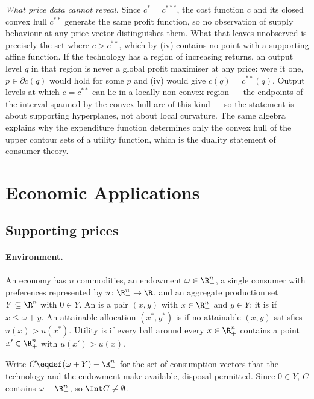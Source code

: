 \emph{What price data cannot reveal.} Since $c^{\ast}=c^{\ast\ast\ast}$, the
cost function $c$ and its closed convex hull $c^{\ast\ast}$ generate the same
profit function, so no observation of supply behaviour at any price vector
distinguishes them. What that leaves unobserved is precisely the set where
$c>c^{\ast\ast}$, which by (iv) contains no point with a supporting affine
function. If the technology has a region of increasing returns, an output level
$q$ in that region is never a global profit maximiser at any price: were it one,
$p\in\partial c(q)$ would hold for some $p$ and (iv) would give
$c(q)=c^{\ast\ast}(q)$. Output levels at which $c=c^{\ast\ast}$ can lie in a
locally non-convex region --- the endpoints of the interval spanned by the
convex hull are of this kind --- so the statement is about supporting
hyperplanes, not about local curvature. The
same algebra explains why the expenditure function determines only the convex
hull of the upper contour sets of a utility function, which is the duality
statement of consumer theory.

\section{Economic Applications}\label{sec:cvx-applications}

\subsection{Supporting prices}\label{subsec:cvx-welfare}

\paragraph{Environment.} An economy has $n$ commodities, an endowment
$\omega\in\R^n_+$, a single consumer with preferences represented by
$u\colon\R^n_+\to\R$, and an aggregate production set $Y\subseteq\R^n$ with
$0\in Y$. An  is a pair $(x,y)$ with $x\in\R^n_+$ and $y\in Y$;
it is  if $x\leq\omega+y$. An attainable
allocation $(x^\ast,y^\ast)$ is  if no
attainable $(x,y)$ satisfies $u(x)>u(x^\ast)$. Utility is  if every ball around every $x\in\R^n_+$
contains a point $x'\in\R^n_+$ with $u(x')>u(x)$.

Write $C\eqdef(\omega+Y)-\R^n_+$ for the set of consumption vectors that the
technology and the endowment make available, disposal permitted. Since
$0\in Y$, $C$ contains $\omega-\R^n_+$, so $\Int C\neq\emptyset$.

